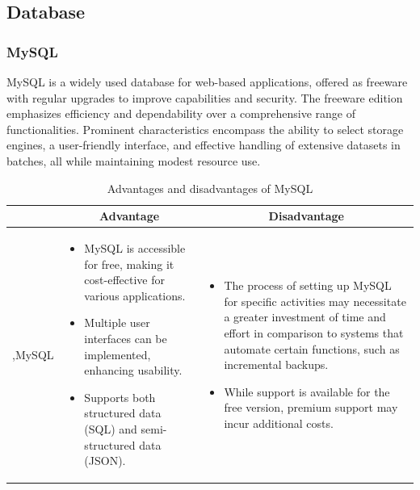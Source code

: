 \subsection{Database}

\subsubsection{MySQL}

MySQL is a widely used database for web-based applications, offered as freeware with regular upgrades to improve capabilities and security. The freeware edition emphasizes efficiency and dependability over a comprehensive range of functionalities. Prominent characteristics encompass the ability to select storage engines, a user-friendly interface, and effective handling of extensive datasets in batches, all while maintaining modest resource use.

\begin{table}[H]
    \centering
    \begin{tabular}{| c | p{} | p{} |}
        \hline
        \multicolumn{1}{|c|}{}
        & \multicolumn{1}{c|}{Advantage}
        & \multicolumn{1}{c|}{Disadvantage} \\ \hline
        \multirow{7}{*}{,MySQL}     
                &   \begin{itemize}[leftmargin=*,topsep=0pt,partopsep=0pt,parsep=0pt]
                        \item MySQL is accessible for free, making it cost-effective for various applications.
                        \item Multiple user interfaces can be implemented, enhancing usability.
                        \item Supports both structured data (SQL) and semi-structured data (JSON).
                    \end{itemize}
                &   \begin{itemize}[leftmargin=*,topsep=0pt,partopsep=0pt,parsep=0pt]
                        \item The process of setting up MySQL for specific activities may necessitate a greater investment of time and effort in comparison to systems that automate certain functions, such as incremental backups.
                        \item While support is available for the free version, premium support may incur additional costs.
                    \end{itemize} \\ \hline
    \end{tabular}
    \caption{Advantages and disadvantages of MySQL}
\end{table}

